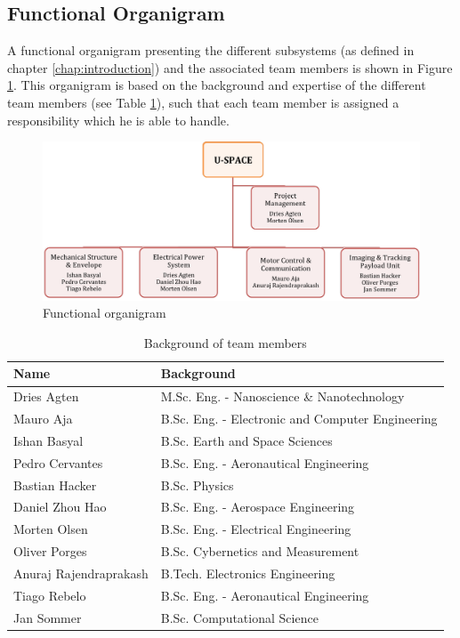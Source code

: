\subsection{Functional Organigram}
%
A functional organigram presenting the different subsystems (as defined in chapter \ref{chap:introduction}) and the associated team members is shown in Figure \ref{fig:obs}. This organigram is based on the background and expertise of the different team members (see Table \ref{tab:backgrounds}), such that each team member is assigned a responsibility which he is able to handle.
%
\begin{figure}[bht]
\centering
\includegraphics[width = \textwidth]{figures/obs.png} %
\caption{Functional organigram}
\label{fig:obs}
\end{figure}
%
\begin{table}[h]
\centering
\caption{Background of team members}
\begin{tabular}{l l}
\hline
\textbf{Name} & \textbf{Background} \\
\hline
Dries Agten & M.Sc. Eng. - Nanoscience \& Nanotechnology \\
Mauro Aja & B.Sc. Eng. - Electronic and Computer Engineering \\
Ishan Basyal & B.Sc. Earth and Space Sciences  \\
Pedro Cervantes & B.Sc. Eng. - Aeronautical Engineering \\
Bastian Hacker & B.Sc. Physics\\
Daniel Zhou Hao & B.Sc. Eng. - Aerospace Engineering\\
Morten Olsen & B.Sc. Eng. - Electrical Engineering \\
Oliver Porges & B.Sc. Cybernetics and Measurement  \\
Anuraj Rajendraprakash & B.Tech. Electronics Engineering \\
Tiago Rebelo & B.Sc. Eng. - Aeronautical Engineering \\
Jan Sommer & B.Sc. Computational Science \\
\hline
\end{tabular}
\label{tab:backgrounds}
\end{table}
%
